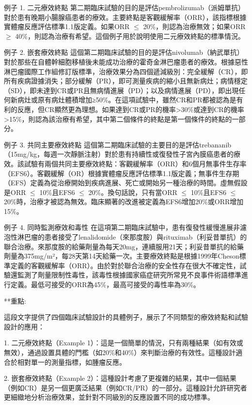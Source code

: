 例子 1. 二元療效終點
第二期臨床試驗的目的是評估pembrolizumab（派姆單抗）對於患有晚期小腸腺癌患者的療效。主要終點是客觀緩解率（ORR），該指標根據實體瘤反應評估標準1.1版定義。如果ORR $\leq$ 20\%，則認為治療無效；如果ORR $\geq$ 40\%，則認為治療有希望。這個例子用於說明使用二元療效終點的標準情況。

例子 2. 嵌套療效終點
這個第二期臨床試驗的目的是評估nivolumab（納武單抗）對於那些在自體幹細胞移植後未能成功治療的霍奇金淋巴瘤患者的療效。根據惡性淋巴瘤國際工作組修訂版標準，治療效果分為四個遞減級別：完全緩解（CR），即所有疾病證據消失；部分緩解（PR），即可測量疾病的縮小且無新病灶；病情穩定（SD），即未達到CR或PR且無病情進展（PD）；以及病情進展（PD），即出現任何新病灶或原有病灶體積增加≥50\%。在這項試驗中，雖然CR和PR都被認為是有利的反應，但CR顯然更為理想。如果達到CR或PR的機率>30\%或達到CR的機率>15\%，則認為該治療有希望，其中第二個條件的終點是第一個條件的終點的一部分。

例子 3. 共同主要療效終點
這個第二期臨床試驗的主要目的是評估trebananib（15mg/kg，每週一次靜脈注射）對於患有持續性或復發性子宮內膜癌患者的療效。該試驗有兩個共同主要療效終點：客觀緩解率（ORR）和6個月無事件生存率（EFS6）。客觀緩解（OR）根據實體瘤反應評估標準1.1版定義；無事件生存期（EFS）定義為從治療開始到疾病進展、死亡或開始另一種治療的時間。虛無假設是ORR $\leq$ 10\%且EFS6 $\leq$ 20\%。換句話說，只有當ORR $\leq$ 10\%且EFS6 $\leq$ 20\%時，治療才被認為無效。臨床顯著的改進被定義為EFS6增加20\%或ORR增加15\%。

例子 4. 同時監測療效和毒性
在這項第二期臨床試驗中，患有復發性緩慢進展非濾泡性淋巴瘤的患者接受了lenalidomide（來那度胺）與rituximab（利妥昔單抗）的聯合治療。來那度胺的給藥劑量為每天20mg，連續服用21天；利妥昔單抗的給藥劑量為375mg/m²，每28天第14天給藥一次。主要療效終點是根據1999年Cheson標準定義的客觀緩解率（ORR）。由於對於聯合治療的安全性存在很大不確定性，試驗還監測了劑量限制性毒性，該毒性根據國家癌症研究所常見不良事件術語標準進行定義。最低可接受的ORR為45\%，最高可接受的毒性率為30\%。

**重點:

這段文字提供了四個臨床試驗設計的具體例子，展示了不同類型的療效終點和試驗設計的應用：

1. 二元療效終點（Example 1）：這是一個簡單的情況，只有兩種結果（如有效或無效），通過設置具體的門檻（如20\%和40\%）來判斷治療的有效性。這種設計適合於相對單一的測量指標，如腫瘤反應。

2. 嵌套療效終點（Example 2）：這種設計考慮了更複雜的結果，其中一個結果（例如CR）是另一個更廣泛結果（例如CR/PR）的一部分。這種設計允許研究者更細緻地分析治療效果，並針對不同級別的反應設置不同的成功標準。

